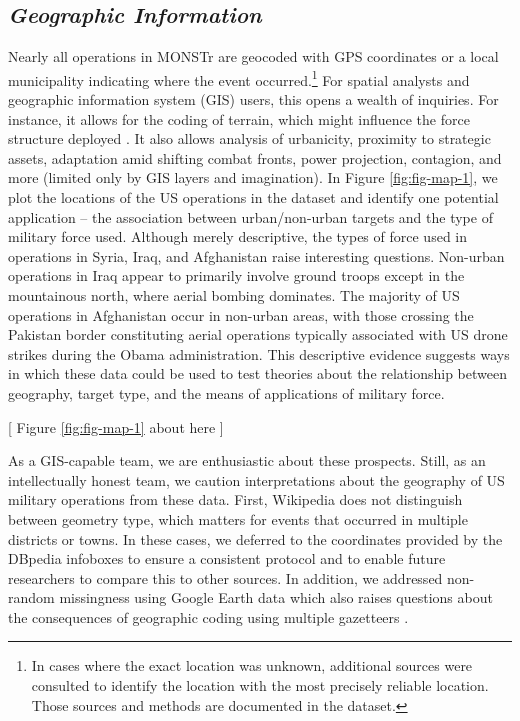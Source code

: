 \documentclass[fleqn,12pt]{article}
\begin{document}
\subsection*{\textit{Geographic Information}}
Nearly all operations in MONSTr are geocoded with GPS coordinates or a local municipality indicating where the event occurred.\footnote{In cases where the exact location was unknown, additional sources were consulted to identify the location with the most precisely reliable location. Those sources and methods are documented in the dataset.} For spatial analysts and geographic information system (GIS) users, this opens a wealth of inquiries. For instance, it allows for the coding of terrain, which might influence the force structure deployed \citep{gleditsch_richardsoninformationage_2012, shaver_terrainruggednessland_2019}. It also allows analysis of urbanicity, proximity to strategic assets, adaptation amid shifting combat fronts, power projection, contagion, and more (limited only by GIS layers and imagination). In Figure \ref{fig:fig-map-1}, we plot the locations of the US operations in the dataset and identify one potential application -- the association between urban/non-urban targets and the type of military force used. Although merely descriptive, the types of force used in operations in Syria, Iraq, and Afghanistan raise interesting questions. Non-urban operations in Iraq appear to primarily involve ground troops except in the mountainous north, where aerial bombing dominates. The majority of US operations in Afghanistan occur in non-urban areas, with those crossing the Pakistan border constituting aerial operations typically associated with US drone strikes during the Obama administration. This descriptive evidence suggests ways in which these data could be used to test theories about the relationship between geography, target type, and the means of applications of military force.

\begin{center}
	[ Figure \ref{fig:fig-map-1} about here ]    
\end{center}

As a GIS-capable team, we are enthusiastic about these prospects. Still, as an intellectually honest team, we caution interpretations about the geography of US military operations from these data. First, Wikipedia does not distinguish between geometry type, which matters for events that occurred in multiple districts or towns. In these cases, we deferred to the coordinates provided by the DBpedia infoboxes to ensure a consistent protocol and to enable future researchers to compare this to other sources. In addition, we addressed non-random missingness using Google Earth data which also raises questions about the consequences of geographic coding using multiple gazetteers \citep{douglass_measuringlandscapecivil_2018}.
\end{document}

